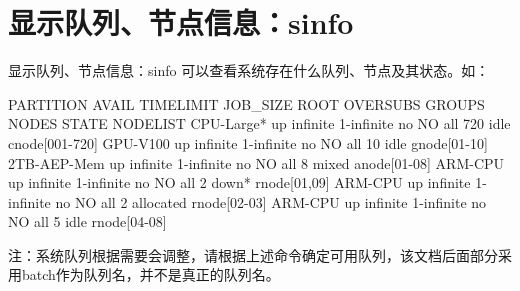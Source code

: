 \section{显示队列、节点信息：sinfo}
\begin{frame}[fragile]{显示队列、节点信息：sinfo}
可以查看系统存在什么队列、节点及其状态。如：
\small
\begin{OUT}
PARTITION   AVAIL  TIMELIMIT   JOB_SIZE ROOT OVERSUBS     GROUPS  NODES       STATE NODELIST
CPU-Large*     up   infinite 1-infinite   no       NO        all    720        idle cnode[001-720]
GPU-V100       up   infinite 1-infinite   no       NO        all     10        idle gnode[01-10]
2TB-AEP-Mem    up   infinite 1-infinite   no       NO        all      8       mixed anode[01-08]
ARM-CPU        up   infinite 1-infinite   no       NO        all      2       down* rnode[01,09]
ARM-CPU        up   infinite 1-infinite   no       NO        all      2   allocated rnode[02-03]
ARM-CPU        up   infinite 1-infinite   no       NO        all      5        idle rnode[04-08]
\end{OUT}
\normalsize
\alert{注：系统队列根据需要会调整，请根据上述命令确定可用队列，该文档后面部分采用batch作为队列名，并不是真正的队列名。}
\end{frame}
